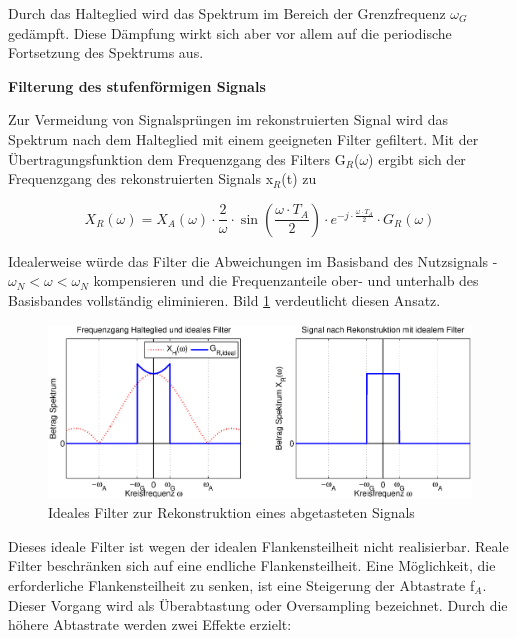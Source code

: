 \noindent Durch das Halteglied wird das Spektrum im Bereich der Grenzfrequenz $\omega_{G}$ ged\"{a}mpft. Diese D\"{a}mpfung wirkt sich aber vor allem auf die periodische Fortsetzung des Spektrums aus. \bigskip

{\selectfont
\noindent\textbf{Filterung des stufenf\"{o}rmigen Signals}} \smallskip

\noindent Zur Vermeidung von Signalspr\"{u}ngen im rekonstruierten Signal wird das Spektrum nach dem Halteglied mit einem geeigneten Filter gefiltert. Mit der \"{U}bertragungsfunktion dem Frequenzgang des Filters G${}_{R}$($\omega$) ergibt sich der Frequenzgang des rekonstruierten Signals x${}_{R}$(t) zu

\begin{equation}\label{eq:twothirty}
X_{R} \left(\omega \right)=X_{A} \left(\omega \right)\cdot \frac{2}{\omega } \cdot \sin \left(\frac{\omega \cdot T_{A} }{2} \right)\cdot e^{-j\cdot \frac{\omega \cdot T_{A} }{2} } \cdot G_{R} \left(\omega \right)
\end{equation}

\noindent Idealerweise w\"{u}rde das Filter die Abweichungen im Basisband des Nutzsignals - $\omega_{N} \mathrm{<} \omega \mathrm{<} \omega_{N}$ kompensieren und die Frequenzanteile ober- und unterhalb des Basisbandes vollst\"{a}ndig eliminieren. Bild \ref{fig:RekonstruktionTiefpassSpektrum} verdeutlicht diesen Ansatz.

\begin{figure}[H]
  \centerline{\includegraphics[width=1\textwidth]{Kapitel1/Bilder/image18}}
  \caption{Ideales Filter zur Rekonstruktion eines abgetasteten Signals}
  \label{fig:RekonstruktionTiefpassSpektrum}
\end{figure}

\clearpage

\noindent Dieses ideale Filter ist wegen der idealen Flankensteilheit nicht realisierbar. Reale Filter beschr\"{a}nken sich auf eine endliche Flankensteilheit. Eine M\"{o}glichkeit, die erforderliche Flankensteilheit zu senken, ist eine Steigerung der Abtastrate f${}_{A}$. Dieser Vorgang wird als \"{U}berabtastung oder Oversampling bezeichnet. Durch die h\"{o}here Abtastrate werden zwei Effekte erzielt:

